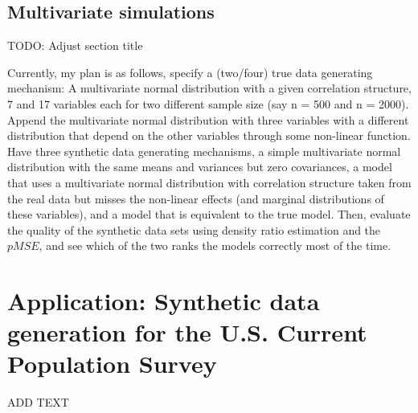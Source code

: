 \documentclass[
]{article}
\begin{document}
\hypertarget{multivariate-simulations}{%
\subsection{Multivariate simulations}\label{multivariate-simulations}}

TODO: Adjust section title

Currently, my plan is as follows, specify a (two/four) true data
generating mechanism: A multivariate normal distribution with a given
correlation structure, 7 and 17 variables each for two different sample
size (say n = 500 and n = 2000). Append the multivariate normal
distribution with three variables with a different distribution that
depend on the other variables through some non-linear function. Have
three synthetic data generating mechanisms, a simple multivariate normal
distribution with the same means and variances but zero covariances, a
model that uses a multivariate normal distribution with correlation
structure taken from the real data but misses the non-linear effects
(and marginal distributions of these variables), and a model that is
equivalent to the true model. Then, evaluate the quality of the
synthetic data sets using density ratio estimation and the \(pMSE\), and
see which of the two ranks the models correctly most of the time.

\hypertarget{application-synthetic-data-generation-for-the-u.s.-current-population-survey}{%
\section{Application: Synthetic data generation for the U.S. Current
Population
Survey}\label{application-synthetic-data-generation-for-the-u.s.-current-population-survey}}

ADD TEXT
\end{document}

